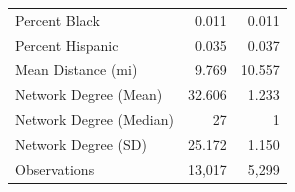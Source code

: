 \begin{tabular}{lrr}
\hspace{1em}Percent Black & 0.011 & 0.011\\
\hspace{1em}Percent Hispanic & 0.035 & 0.037\\
\hspace{1em}Mean Distance (mi) & 9.769 & 10.557\\
\hspace{1em}Network Degree (Mean) & 32.606 & 1.233\\
\hspace{1em}Network Degree (Median) & 27 & 1\\
\hspace{1em}Network Degree (SD) & 25.172 & 1.150\\
\hspace{1em}Observations & 13,017 & 5,299\\
\bottomrule
\end{tabular}
